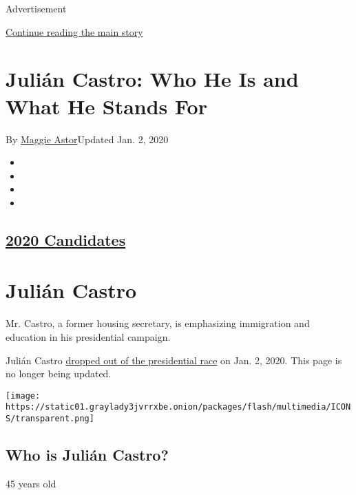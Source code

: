 Advertisement

\protect\hyperlink{after-top}{Continue reading the main story}

\hypertarget{juliuxe1n-castro-who-he-is-and-what-he-stands-for}{%
\section{Julián Castro: Who He Is and What He Stands
For}\label{juliuxe1n-castro-who-he-is-and-what-he-stands-for}}

By \href{https://www.nytimes3xbfgragh.onion/by/maggie-astor}{Maggie
Astor}Updated Jan. 2, 2020

\begin{itemize}
\item
\item
\item
\item
\end{itemize}

\hypertarget{2020-candidates}{%
\subsection{\texorpdfstring{\href{https://www.nytimes3xbfgragh.onion/interactive/2019/us/politics/2020-presidential-candidates.html}{2020
Candidates}}{2020 Candidates}}\label{2020-candidates}}

\hypertarget{juliuxe1n-castro}{%
\section{Julián Castro}\label{juliuxe1n-castro}}

Mr. Castro, a former housing secretary, is emphasizing immigration and
education in his presidential campaign.

Julián Castro
\href{https://www.nytimes3xbfgragh.onion/2020/01/02/us/politics/julian-castro-dropping-out.html}{dropped
out of the presidential race} on Jan. 2, 2020. This page is no longer
being updated.

\texttt{[image: https://static01.graylady3jvrrxbe.onion/packages/flash/multimedia/ICONS/transparent.png]}

\hypertarget{who-is-juliuxe1n-castro}{%
\subsection{Who is Julián Castro?}\label{who-is-juliuxe1n-castro}}

45 years old

